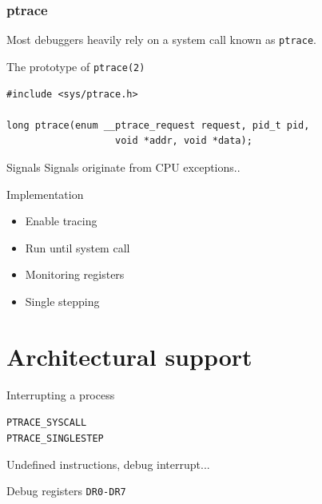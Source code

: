 \documentclass{beamer} %
\newcommand*{\ptrace}{\texttt{ptrace}}
\newcommand*{\ptraceman}{\texttt{ptrace(2)}}
\begin{document}
\begin{frame}[fragile]
\frametitle{ptrace}

Most debuggers heavily rely on a system call known as \ptrace.
\vskip1cm
\begin{block}{The prototype of \ptraceman}
\begin{verbatim}
#include <sys/ptrace.h>

long ptrace(enum __ptrace_request request, pid_t pid,
                   void *addr, void *data);
\end{verbatim}
\end{block}
\end{frame}

\begin{frame}{Signals}
Signals originate from CPU exceptions..
\end{frame}

\begin{frame}{Implementation}
\begin{itemize}[<+- | alert@+>]
    \item<1-> \alert<2>{Enable tracing}
    \item<1-> \alert<3>{Run until system call}
    \item<1-> \alert<4>{Monitoring registers}
    \item<1-> \alert<5>{Single stepping}
\end{itemize}
\end{frame}

\section{Architectural support}

\begin{frame}{Interrupting a process}

\texttt{PTRACE\_SYSCALL} \\
\texttt{PTRACE\_SINGLESTEP}

Undefined instructions, debug interrupt...

\end{frame}

\begin{frame}{Debug registers}
\texttt{DR0-DR7}
\end{frame}
\end{document}
